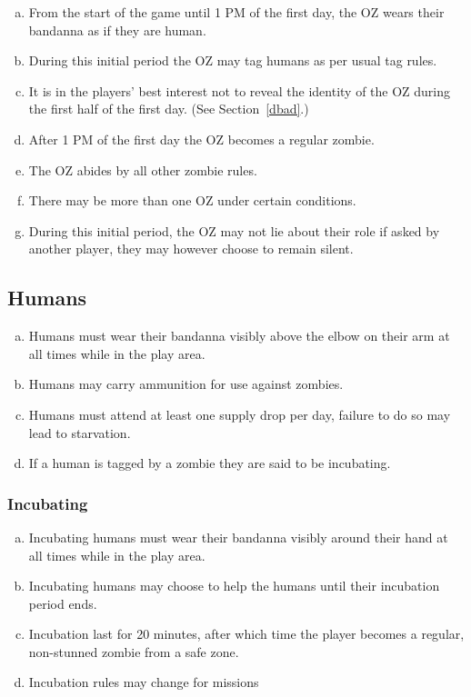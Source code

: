 \documentclass[a4paper,12pt]{article}
\begin{document}
\begin{enumerate}[(a)]
    \item From the start of the game until 1 PM of the first day, the OZ wears their bandanna as if they are human. 
    \item During this initial period the OZ may tag humans as per usual tag rules.
    \item It is in the players' best interest not to reveal the identity of the OZ during the first half of the first day. (See Section~\ref{dbad}.)
    \item After 1 PM of the first day the OZ becomes a regular zombie.
    \item The OZ abides by all other zombie rules.
    \item There may be more than one OZ under certain conditions.
    \item During this initial period, the OZ may not lie about their role if asked by another player, they may however choose to remain silent. 
\end{enumerate}

\subsection{Humans}

\begin{enumerate}[(a)]
    \item Humans must wear their bandanna visibly above the elbow on their arm at all times while in the play area.
    \item Humans may carry ammunition for use against zombies.
    \item Humans must attend at least one supply drop per day, failure to do so may lead to starvation.
    \item If a human is tagged by a zombie they are said to be incubating.
\end{enumerate}

\subsubsection{Incubating}
\label{Incubating}
\begin{enumerate}[(a)]
    \item Incubating humans must wear their bandanna visibly around their hand at all times while in the play area.
    \item Incubating humans may choose to help the humans until their incubation period ends.
    \item Incubation last for 20 minutes, after which time the player becomes a regular, non-stunned zombie from a safe zone.
    \item Incubation rules may change for missions
\end{enumerate}
\end{document}
